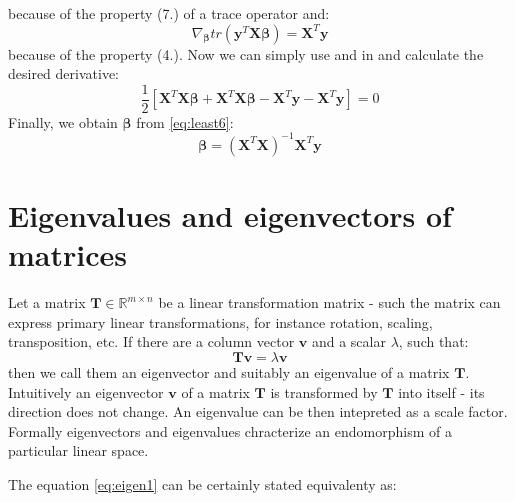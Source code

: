 \begin{appendices}
because of the property (7.) of a trace operator and:
\begin{equation}\label{eq:least5}
    \nabla_{\boldsymbol{\beta}}tr(\boldsymbol{y}^T\boldsymbol{X}\boldsymbol{\beta}) = \boldsymbol{X}^T\boldsymbol{y}
\end{equation}
because of the property (4.).
Now we can simply use  and  in  and calculate the desired derivative:
\begin{equation}\label{eq:least6}
    \frac{1}{2}[\boldsymbol{X}^T\boldsymbol{X}\boldsymbol{\beta}+\boldsymbol{X}^T\boldsymbol{X}\boldsymbol{\beta}-\boldsymbol{X}^T\boldsymbol{y}-\boldsymbol{X}^T\boldsymbol{y}] = 0
\end{equation}
Finally, we obtain $\boldsymbol{\beta}$ from \cref{eq:least6}:
\begin{equation}
    \boldsymbol{\beta}=(\boldsymbol{X}^T\boldsymbol{X})^{-1}\boldsymbol{X}^T\boldsymbol{y}
\end{equation}

\newpage
\section{Eigenvalues and eigenvectors of matrices}
\label{app:eigen}

Let a matrix $\boldsymbol{T} \in \mathbb{R}^{m \times n}$ be a linear transformation matrix - such the matrix can express primary linear transformations, for instance rotation, scaling, transposition, etc. If there are a column vector $\boldsymbol{v}$ and a scalar $\lambda$, such that:
\begin{equation}\label{eq:eigen1}
    \boldsymbol{T}\boldsymbol{v}=\lambda{\boldsymbol{v}}
\end{equation}
then we call them an eigenvector and suitably an eigenvalue of a matrix $\boldsymbol{T}$. Intuitively an eigenvector $\boldsymbol{v}$ of a matrix $\boldsymbol{T}$ is transformed by $\boldsymbol{T}$ into itself - its direction does not change. An eigenvalue can be then intepreted as a scale factor. Formally eigenvectors and eigenvalues chracterize an endomorphism of a particular linear space.  

The equation \ref{eq:eigen1} can be certainly stated equivalenty as:


\end{appendices}
